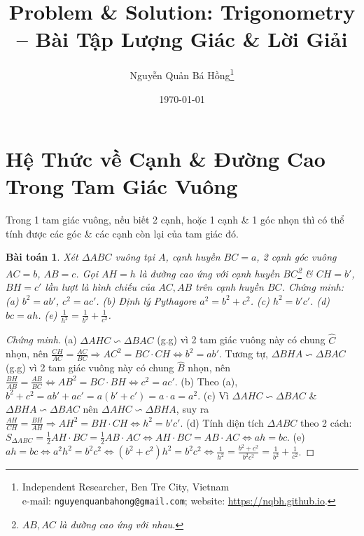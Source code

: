 \documentclass{article}
\title{Problem \& Solution: Trigonometry -- Bài Tập Lượng Giác \& Lời Giải}
\author{Nguyễn Quản Bá Hồng\footnote{Independent Researcher, Ben Tre City, Vietnam\\e-mail: \texttt{nguyenquanbahong@gmail.com}; website: \url{https://nqbh.github.io}.}}
\date{\today}
\newtheorem{baitoan}{Bài toán}
\begin{document}
\maketitle
\begin{abstract}
	
\end{abstract}
\tableofcontents


\section{Hệ Thức về Cạnh \& Đường Cao Trong Tam Giác Vuông}
Trong 1 tam giác vuông, nếu biết 2 cạnh, hoặc 1 cạnh \& 1 góc nhọn thì có thể tính được các góc \& các cạnh còn lại của tam giác đó.

\begin{baitoan}
	Xét $\Delta ABC$ vuông tại $A$, cạnh huyền $BC = a$, 2 cạnh góc vuông $AC = b$, $AB = c$. Gọi $AH = h$ là đường cao ứng với cạnh huyền $BC$\footnote{$AB,AC$ là đường cao ứng với nhau.} \& $CH = b'$, $BH = c'$ lần lượt là hình chiếu của $AC, AB$ trên cạnh huyền $BC$. Chứng minh: (a) $b^2 = ab'$, $c^2 = ac'$. (b) Định lý Pythagore $a^2 = b^2 + c^2$. (c) $h^2 = b'c'$. (d) $bc = ah$. (e) $\frac{1}{h^2} = \frac{1}{b^2} + \frac{1}{c^2}$.
\end{baitoan}

\begin{proof}[Chứng minh]
	(a) $\Delta AHC\backsim\Delta BAC$ (g.g) vì 2 tam giác vuông này có chung $\widehat{C}$ nhọn, nên $\frac{CH}{AC} = \frac{AC}{BC}\Rightarrow AC^2 = BC\cdot CH\Leftrightarrow b^2 = ab'$. Tương tự, $\Delta BHA\backsim\Delta BAC$ (g.g)  vì 2 tam giác vuông này có chung $\widehat{B}$ nhọn, nên $\frac{BH}{AB} = \frac{AB}{BC}\Leftrightarrow AB^2 = BC\cdot BH\Leftrightarrow c^2 = ac'$. (b) Theo (a), $b^2 + c^2 = ab' + ac' = a(b' + c') = a\cdot a = a^2$. (c) Vì $\Delta AHC\backsim\Delta BAC$ \& $\Delta BHA\backsim\Delta BAC$ nên $\Delta AHC\backsim\Delta BHA$, suy ra $\frac{AH}{CH} = \frac{BH}{AH}\Rightarrow AH^2 = BH\cdot CH\Leftrightarrow h^2 = b'c'$. (d) Tính diện tích $\Delta ABC$ theo 2 cách: $S_{\Delta ABC} = \frac{1}{2}AH\cdot BC = \frac{1}{2}AB\cdot AC\Leftrightarrow AH\cdot BC = AB\cdot AC\Leftrightarrow ah = bc$. (e) $ah = bc\Leftrightarrow a^2h^2 = b^2c^2\Leftrightarrow(b^2 + c^2)h^2 = b^2c^2\Leftrightarrow\frac{1}{h^2} = \frac{b^2 + c^2}{b^2c^2} = \frac{1}{b^2} + \frac{1}{c^2}$.
\end{proof}
\end{document}
